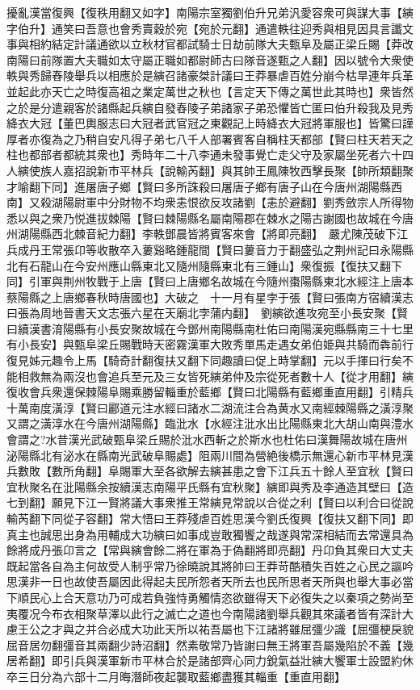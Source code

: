 擾亂漢當復興【復秩用翻又如字】南陽宗室獨劉伯升兄弟汎愛容衆可與謀大事【縯字伯升】通笑曰吾意也會秀賣穀於宛【宛於元翻】通遣軼往迎秀與相見因具言讖文事與相約結定計議通欲以立秋材官都試騎士日劫前隊大夫甄阜及屬正梁丘賜【莽改南陽曰前隊置大夫職如太守屬正職如都尉師古曰隊音遂甄之人翻】因以號令大衆使軼與秀歸舂陵舉兵以相應於是縯召諸豪桀計議曰王莽暴虐百姓分崩今枯旱連年兵革並起此亦天亡之時復高祖之業定萬世之秋也【言定天下傳之萬世此其時也】衆皆然之於是分遣親客於諸縣起兵縯自發舂陵子弟諸家子弟恐懼皆亡匿曰伯升殺我及見秀絳衣大冠【董巴輿服志曰大冠者武官冠之東觀記上時絳衣大冠將軍服也】皆驚曰謹厚者亦復為之乃稍自安凡得子弟七八千人部署賓客自稱柱天都部【賢曰柱天若天之柱也都部者都統其衆也】秀時年二十八李通未發事覺亡走父守及家屬坐死者六十四人縯使族人嘉招說新市平林兵【說輸芮翻】與其帥王鳳陳牧西擊長聚【帥所類翻聚才喻翻下同】進屠唐子鄉【賢曰多所誅殺曰屠唐子鄉有唐子山在今唐州湖陽縣西南】又殺湖陽尉軍中分財物不均衆恚恨欲反攻諸劉【恚於避翻】劉秀斂宗人所得物悉以與之衆乃悦進拔棘陽【賢曰棘陽縣名屬南陽郡在棘水之陽古謝國也故城在今唐州湖陽縣西北棘音紀力翻】李軼鄧晨皆將賓客來會【將即亮翻】　嚴尤陳茂破下江兵成丹王常張卬等收散卒入蔞谿略鍾龍間【賢曰蔞音力于翻盛弘之荆州記曰永陽縣北有石龍山在今安州應山縣東北又隨州隨縣東北有三鍾山】衆復振【復扶又翻下同】引軍與荆州牧戰于上唐【賢曰上唐鄉名故城在今隨州棗陽縣東北水經注上唐本蔡陽縣之上唐鄉春秋時唐國也】大破之　十一月有星孛于張【賢曰張南方宿續漢志曰張為周地晉書天文志張六星在天廟北孛蒲内翻】　劉縯欲進攻宛至小長安聚【賢曰續漢書淯陽縣有小長安聚故城在今鄧州南陽縣南杜佑曰南陽漢宛縣縣南三十七里有小長安】與甄阜梁丘賜戰時天密霧漢軍大敗秀單馬走遇女弟伯姫與共騎而犇前行復見姊元趣令上馬【騎奇計翻復扶又翻下同趣讀曰促上時掌翻】元以手揮曰行矣不能相救無為兩沒也會追兵至元及三女皆死縯弟仲及宗從死者數十人【從才用翻】縯復收會兵衆還保棘陽阜賜乘勝留輜重於藍鄉【賢曰北陽縣有藍鄉重直用翻】引精兵十萬南度潢淳【賢曰酈道元注水經曰諸水二湖流注合為黄水又南經棘陽縣之潢淳聚又謂之潢淳水在今唐州湖陽縣】臨沘水【水經注沘水出比陽縣東北大胡山南與澧水會謂之?水昔漢光武破甄阜梁丘賜於沘水西斬之於斯水也杜佑曰漢舞陽故城在唐州泌陽縣北有泌水在縣南光武破阜賜處】阻兩川間為營絶後橋示無還心新市平林見漢兵數敗【數所角翻】阜賜軍大至各欲解去縯甚患之會下江兵五十餘人至宜秋【賢曰宜秋聚名在沘陽縣余按續漢志南陽平氏縣有宜秋聚】縯即與秀及李通造其壁曰【造七到翻】願見下江一賢將議大事衆推王常縯見常說以合從之利【賢曰以利合曰從說輸芮翻下同從子容翻】常大悟曰王莽殘虐百姓思漢今劉氏復興【復扶又翻下同】即真主也誠思出身為用輔成大功縯曰如事成豈敢獨饗之哉遂與常深相結而去常還具為餘將成丹張卬言之【常與縯會餘二將在軍為于偽翻將即亮翻】丹卬負其衆曰大丈夫既起當各自為主何故受人制乎常乃徐曉說其將帥曰王莽苛酷積失百姓之心民之謳吟思漢非一日也故使吾屬因此得起夫民所怨者天所去也民所思者天所與也舉大事必當下順民心上合天意功乃可成若負強恃勇觸情恣欲雖得天下必復失之以秦項之勢尚至夷覆况今布衣相聚草澤以此行之滅亡之道也今南陽諸劉舉兵觀其來議者皆有深計大慮王公之才與之并合必成大功此天所以祐吾屬也下江諸將雖屈彊少識【屈彊梗戾貌屈音居勿翻彊音其兩翻少詩沼翻】然素敬常乃皆謝曰無王將軍吾屬幾陷於不義【幾居希翻】即引兵與漢軍新市平林合於是諸部齊心同力銳氣益壯縯大饗軍士設盟約休卒三日分為六部十二月晦潛師夜起襲取藍鄉盡獲其輜重【重直用翻】

